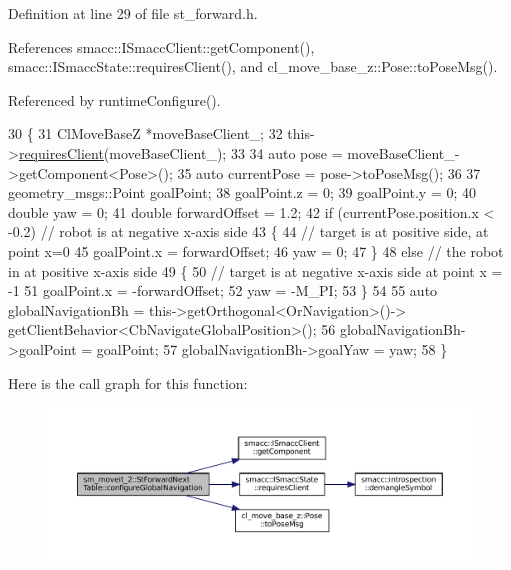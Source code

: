 Definition at line 29 of file st\+\_\+forward.\+h.



References smacc\+::\+I\+Smacc\+Client\+::get\+Component(), smacc\+::\+I\+Smacc\+State\+::requires\+Client(), and cl\+\_\+move\+\_\+base\+\_\+z\+::\+Pose\+::to\+Pose\+Msg().



Referenced by runtime\+Configure().


\begin{DoxyCode}
30   \{
31     ClMoveBaseZ *moveBaseClient\_;
32     this->\hyperlink{classsmacc_1_1ISmaccState_a7f95c9f0a6ea2d6f18d1aec0519de4ac}{requiresClient}(moveBaseClient\_);
33 
34     \textcolor{keyword}{auto} pose = moveBaseClient\_->getComponent<Pose>();
35     \textcolor{keyword}{auto} currentPose = pose->toPoseMsg();
36 
37     geometry\_msgs::Point goalPoint;
38     goalPoint.z = 0;
39     goalPoint.y = 0;
40     \textcolor{keywordtype}{double} yaw = 0;
41     \textcolor{keywordtype}{double} forwardOffset = 1.2;
42     \textcolor{keywordflow}{if} (currentPose.position.x < -0.2)  \textcolor{comment}{// robot is at negative x-axis side}
43     \{
44       \textcolor{comment}{// target is at positive side, at point x=0}
45       goalPoint.x = forwardOffset;
46       yaw = 0;
47     \}
48     \textcolor{keywordflow}{else}  \textcolor{comment}{// the robot in at positive x-axis side}
49     \{
50       \textcolor{comment}{// target is at negative x-axis side at point x = -1}
51       goalPoint.x = -forwardOffset;
52       yaw = -M\_PI;
53     \}
54 
55     \textcolor{keyword}{auto} globalNavigationBh = this->getOrthogonal<OrNavigation>()->
      getClientBehavior<CbNavigateGlobalPosition>();
56     globalNavigationBh->goalPoint = goalPoint;
57     globalNavigationBh->goalYaw = yaw;
58   \}
\end{DoxyCode}
Here is the call graph for this function\+:
\nopagebreak
\begin{figure}[H]
\begin{center}
\leavevmode
\includegraphics[width=350pt]{structsm__moveit__2_1_1StForwardNextTable_a79b062960dd4f3b75464f3e47b87d79c_cgraph}
\end{center}
\end{figure}
